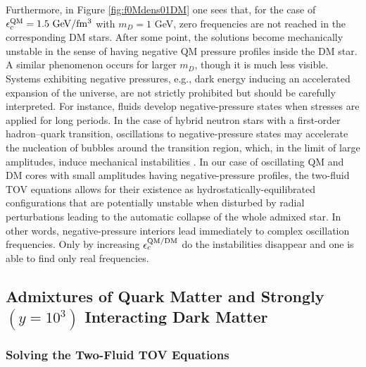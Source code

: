 \documentclass[universe,article,accept,moreauthors,pdftex]{Definitions/mdpi}
\begin{document}


Furthermore, in Figure \ref{fig:f0Mdens01DM} one sees that, for the case of $\epsilon^{\rm QM}_{c}=1.5~{\rm GeV/fm^{3}}$ with $m_{D}=1$ GeV, zero frequencies are not reached in the corresponding DM stars. After some point, the solutions become mechanically unstable in the sense of having negative QM pressure profiles inside the DM star. A similar phenomenon occurs for larger $m_{D}$, though it is much less visible. Systems exhibiting negative pressures, e.g., dark energy inducing an accelerated expansion of the universe, are not strictly prohibited but should be carefully interpreted. For instance, fluids develop negative-pressure states when stresses are applied for long periods. In the case of hybrid neutron stars with a first-order hadron--quark transition, oscillations to negative-pressure states may accelerate the nucleation of bubbles around the transition region, which, in the limit of large amplitudes, induce mechanical instabilities \cite{Kapusta:2006pm}. In our case of oscillating QM and DM cores with small amplitudes having negative-pressure profiles, the two-fluid TOV equations allows for their existence as hydrostatically-equilibrated configurations that are potentially unstable when disturbed by radial perturbations leading to the automatic collapse of the whole admixed star. In other words, negative-pressure interiors lead immediately to complex oscillation frequencies. Only by increasing $\epsilon^{\rm QM/DM}_{c}$ do the instabilities disappear and one is able to find only real frequencies.
 
\subsection{Admixtures of Quark Matter and Strongly $(y=10^{3})$ Interacting Dark Matter}

\subsubsection{Solving the Two-Fluid TOV Equations}
\end{document}
